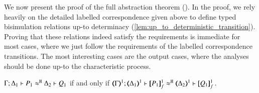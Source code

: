 

We now present the proof of the full abstraction theorem ().
In the proof, we rely heavily on the detailed labelled correspondence given above to define 
typed bisimulation relations up-to determinacy (\ref{lem:up_to_deterministic_transition}). 
Proving that these relations indeed satisfy the requirements is immediate for most cases, where we just follow the requirements of the labelled correspondence transitions.
The most interesting cases are the output cases, where the analyses should be done up-to the characteristic process.


\begin{proposition}\rm
	\label{app:prop:fulla_HOp_to_HO}
	$\Gamma; \Delta_1 \vdash P_1 \approx^\mathtt{H} \Delta_2 \vdash Q_1$
	if and only if
	$\horel{\tmap{\Gamma}{1}}{\tmap{\Delta_1}{1}}{\pmapp{P_1}{1}{f}}{\hwb}{\tmap{\Delta_2}{1}}{\pmapp{Q_1}{1}{f}}$.
\end{proposition}


